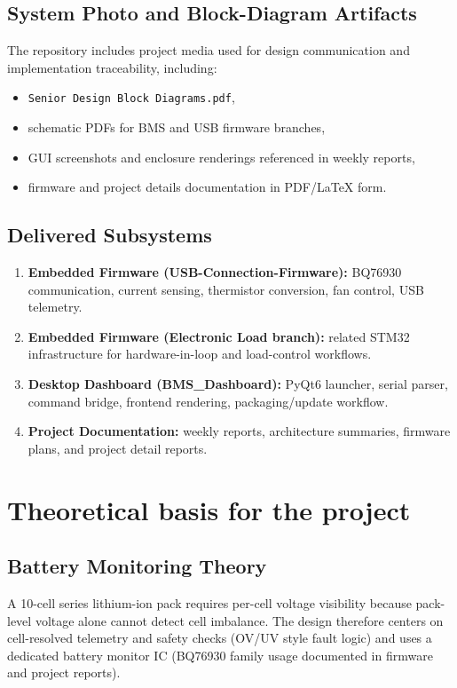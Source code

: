 \documentclass[12pt]{article}
\begin{document}
\subsection{System Photo and Block-Diagram Artifacts}
The repository includes project media used for design communication and implementation traceability, including:
\begin{itemize}[leftmargin=1.2cm]
    \item \texttt{Senior Design Block Diagrams.pdf},
    \item schematic PDFs for BMS and USB firmware branches,
    \item GUI screenshots and enclosure renderings referenced in weekly reports,
    \item firmware and project details documentation in PDF/\LaTeX{} form.
\end{itemize}

\subsection{Delivered Subsystems}
\begin{enumerate}[leftmargin=1.2cm]
    \item \textbf{Embedded Firmware (USB-Connection-Firmware):} BQ76930 communication, current sensing, thermistor conversion, fan control, USB telemetry.
    \item \textbf{Embedded Firmware (Electronic Load branch):} related STM32 infrastructure for hardware-in-loop and load-control workflows.
    \item \textbf{Desktop Dashboard (BMS\_Dashboard):} PyQt6 launcher, serial parser, command bridge, frontend rendering, packaging/update workflow.
    \item \textbf{Project Documentation:} weekly reports, architecture summaries, firmware plans, and project detail reports.
\end{enumerate}

\section{Theoretical basis for the project}

\subsection{Battery Monitoring Theory}
A 10-cell series lithium-ion pack requires per-cell voltage visibility because pack-level voltage alone cannot detect cell imbalance. The design therefore centers on cell-resolved telemetry and safety checks (OV/UV style fault logic) and uses a dedicated battery monitor IC (BQ76930 family usage documented in firmware and project reports).
\end{document}
